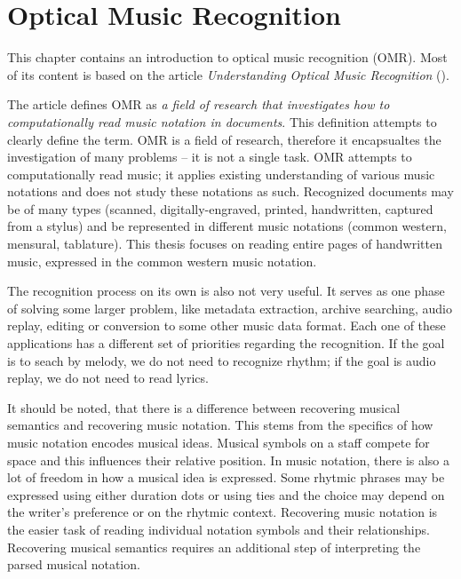 \chapter{Optical Music Recognition}
\label{chap:OMR}

This chapter contains an introduction to optical music recognition (OMR). Most of its content is based on the article \emph{Understanding Optical Music Recognition} (\cite{UnderstandingOmr}).

The article defines OMR as \emph{a field of research that investigates how to computationally read music notation in documents}. This definition attempts to clearly define the term. OMR is a field of research, therefore it encapsualtes the investigation of many problems -- it is not a single task. OMR attempts to computationally read music; it applies existing understanding of various music notations and does not study these notations as such. Recognized documents may be of many types (scanned, digitally-engraved, printed, handwritten, captured from a stylus) and be represented in different music notations (common western, mensural, tablature). This thesis focuses on reading entire pages of handwritten music, expressed in the common western music notation.

The recognition process on its own is also not very useful. It serves as one phase of solving some larger problem, like metadata extraction, archive searching, audio replay, editing or conversion to some other music data format. Each one of these applications has a different set of priorities regarding the recognition. If the goal is to seach by melody, we do not need to recognize rhythm; if the goal is audio replay, we do not need to read lyrics.

It should be noted, that there is a difference between recovering musical semantics and recovering music notation. This stems from the specifics of how music notation encodes musical ideas. Musical symbols on a staff compete for space and this influences their relative position. In music notation, there is also a lot of freedom in how a musical idea is expressed. Some rhytmic phrases may be expressed using either duration dots or using ties and the choice may depend on the writer's preference or on the rhytmic context. Recovering music notation is the easier task of reading individual notation symbols and their relationships. Recovering musical semantics requires an additional step of interpreting the parsed musical notation.

